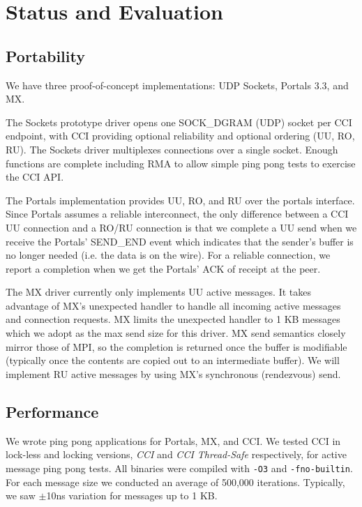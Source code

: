 \section{Status and Evaluation}
\label{sec:evaluation}

\subsection{Portability}
We have three proof-of-concept implementations: UDP Sockets, Portals 3.3, and MX.

The Sockets prototype driver opens one SOCK\_DGRAM (UDP) socket per
CCI endpoint, with CCI  providing optional reliability and optional
ordering (UU, RO, RU). 
The Sockets driver multiplexes connections over a single socket.
Enough functions are complete including RMA to allow simple ping pong
tests to exercise the CCI API.

The Portals implementation provides UU, RO, and RU over the portals
interface. Since Portals assumes a reliable interconnect, the
only difference between a CCI UU connection and a RO/RU connection is that we
complete a UU send when we receive the Portals' SEND\_END event which indicates
that the sender's buffer is no longer needed (i.e. the data is on the wire).
For a reliable connection, we report a completion when we get the Portals' ACK
of receipt at the peer.

The MX driver currently only implements UU active messages.  It takes advantage of
MX's unexpected handler to handle all incoming active messages and connection
requests. MX limits the unexpected handler to 1 KB messages which we adopt as the max
send size for this driver. MX send semantics closely mirror those of MPI, so the
completion is returned once the buffer is modifiable (typically once the contents are
copied out to an intermediate buffer). We will implement RU active messages by using
MX's synchronous (rendezvous) send.

\subsection{Performance}
We wrote ping pong applications for Portals, MX, and CCI.  We tested CCI in lock-less
and locking versions, \emph{CCI} and \emph{CCI Thread-Safe} respectively, for active
message ping pong tests. All binaries were compiled with \texttt{-O3} and
\texttt{-fno-builtin}. For each message size we conducted an average of 500,000 iterations. Typically,
we saw $\pm$10ns variation for messages up to 1 KB.

